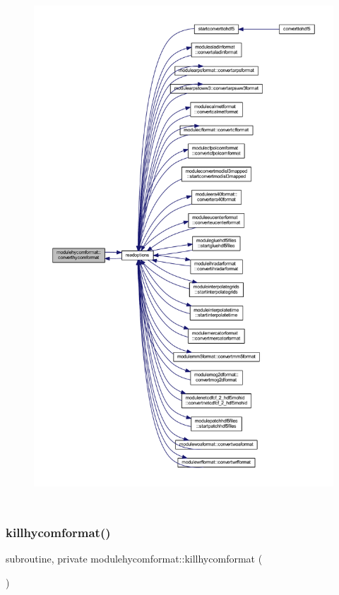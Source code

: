 \begin{figure}[H]
\begin{center}
\leavevmode
\includegraphics[height=550pt]{namespacemodulehycomformat_a75ba9ace07164a1aac61c55e48af9959_icgraph}
\end{center}
\end{figure}
\mbox{\label{namespacemodulehycomformat_aa2e49450c9d2acce5c240fae7e58eb05}} 
\subsubsection{\texorpdfstring{killhycomformat()}{killhycomformat()}}
{\footnotesize\ttfamily subroutine, private modulehycomformat\+::killhycomformat (\begin{DoxyParamCaption}{ }\end{DoxyParamCaption})\hspace{0.3cm}{\ttfamily [private]}}

